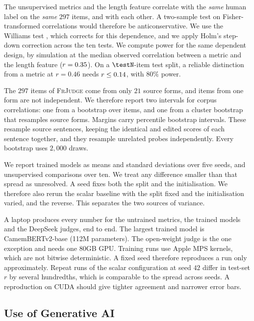 \documentclass{BVP_JCLLT}
\newcommand{\rev}[1]{#1}
\newcommand{\rev}[1]{{\color{revcol}#1}}
\begin{document}
\rev{The unsupervised metrics and the length feature correlate with the
\emph{same} human label on the \emph{same} $297$ items, and with each other. A
two-sample test on Fisher-transformed correlations would therefore be
anticonservative. We use the Williams test
\cite{steiger1980tests,graham2014williams}, which corrects for this dependence,
and we apply Holm's step-down correction across the ten tests. We compute power
for the same dependent design, by simulation at the median observed correlation
between a metric and the length feature ($r=0.35$). On a
$\testN$-item test split, a reliable distinction from a metric at $r=0.46$ needs
$r \leq 0.14$, with $80\%$ power.

The $297$ items of \textsc{FrJudge} come from only $21$ source forms, and items
from one form are not independent. We therefore report two intervals for corpus
correlations: one from a bootstrap over items, and one from a cluster bootstrap
that resamples source forms. Margins carry percentile bootstrap intervals. These
resample source sentences, keeping the identical and edited scores of each
sentence together, and they resample unrelated probes independently. Every
bootstrap uses $2{,}000$ draws.

We report trained models as means and standard deviations over five seeds, and
unsupervised comparisons over ten. We treat any difference smaller than that
spread as unresolved. A seed fixes both the split and the initialisation. We therefore
also rerun the scalar baseline with the split fixed and the initialisation
varied, and the reverse. This separates the two sources of variance.

A laptop produces every number for the untrained metrics, the trained models and
the DeepSeek judges, end to end. The largest trained model is CamemBERTv2-base
(112M parameters). The open-weight judge is the one exception and needs one 80GB
GPU. Training runs use Apple MPS kernels, which are not bitwise deterministic. A
fixed seed therefore reproduces a run only approximately. Repeat runs of the
scalar configuration at seed $42$ differ in test-set $r$ by several hundredths,
which is comparable to the spread across seeds. A reproduction on CUDA should
give tighter agreement and narrower error bars.}

\subsection{Use of Generative AI}\label{sec:aidisclosure}
\end{document}

